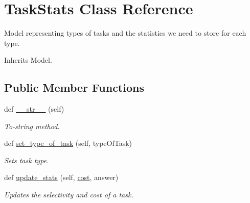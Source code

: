 \hypertarget{classjoinapp_1_1models_1_1task__management__models_1_1_task_stats}{}\section{Task\+Stats Class Reference}
\label{classjoinapp_1_1models_1_1task__management__models_1_1_task_stats}


Model representing types of tasks and the statistics we need to store for each type.  




Inherits Model.

\subsection*{Public Member Functions}
\begin{DoxyCompactItemize}
\item 
def \mbox{\hyperlink{classjoinapp_1_1models_1_1task__management__models_1_1_task_stats_a23e8041ce1015febe4fdace3225714f9}{\+\_\+\+\_\+str\+\_\+\+\_\+}} (self)
\begin{DoxyCompactList}\small\item\em To-\/string method. \end{DoxyCompactList}\item 
def \mbox{\hyperlink{classjoinapp_1_1models_1_1task__management__models_1_1_task_stats_a1215690580b8f987fcd20c3ac313fdfd}{set\+\_\+type\+\_\+of\+\_\+task}} (self, type\+Of\+Task)
\begin{DoxyCompactList}\small\item\em Sets task type. \end{DoxyCompactList}\item 
def \mbox{\hyperlink{classjoinapp_1_1models_1_1task__management__models_1_1_task_stats_a874fc59d510f25a4bea891ea44e76774}{update\+\_\+stats}} (self, \mbox{\hyperlink{classjoinapp_1_1models_1_1task__management__models_1_1_task_stats_a6ce3360f2586a441b79b1053cfd2769c}{cost}}, answer)
\begin{DoxyCompactList}\small\item\em Updates the selectivity and cost of a task. \end{DoxyCompactList}\end{DoxyCompactItemize}
